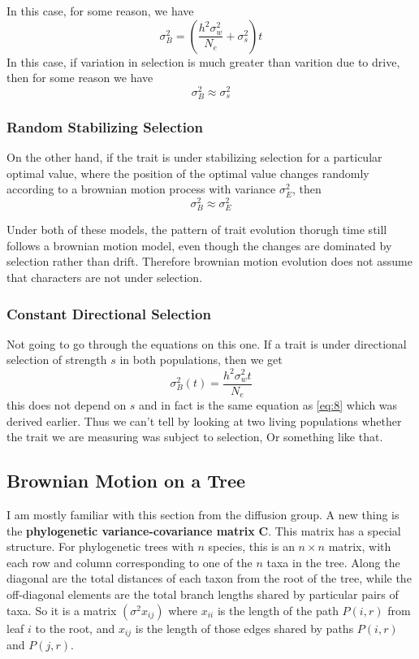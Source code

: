 \documentclass{article}
\newcommand{\1}[1]{\textbf{1}_{\left[#1\right]}} %
\newcommand{\bvar}{\sigma_{B}^{2}}  %
\newcommand{\wvar}{\sigma_{w}^{2}}  %
\newcommand{\svar}{\sigma_{s}^{2}}  %
\begin{document}
In this case, for some reason, we have
\begin{equation}
  \label{eq:9}
  \bvar = \left( \frac{h^{2}\wvar}{N_{e}}+ \svar \right)t
\end{equation}
In this case, if variation in selection is much greater than varition due to
drive, then for some reason we have
\begin{equation}
  \label{eq:3}
  \bvar \approx \svar
\end{equation}

\subsubsection{Random Stabilizing Selection}

On the other hand, if the trait is under stabilizing selection for a particular
optimal value, where the position of the optimal value changes randomly
according to a brownian motion process with variance $\sigma_{E}^{2}$, then
\begin{equation*}
  \bvar \approx \sigma^{2}_{E}
\end{equation*}

Under both of these models, the pattern of trait evolution thorugh time still
follows a brownian motion model, even though the changes are dominated by
selection rather than drift. Therefore brownian motion evolution does not assume
that characters are not under selection.

\subsubsection{Constant Directional Selection}

Not going to go through the equations on this one. If a trait is under
directional selection of strength $s$ in both populations, then we get
\begin{equation}
  \label{eq:10}
  \bvar(t) = \frac{h^{2}\wvar t}{N_{e}}
\end{equation}
this does not depend on $s$ and in fact is the same equation as \eqref{eq:8}
which was derived earlier. Thus we can't tell by looking at two living
populations whether the trait we are measuring was subject to selection, Or
something like that.

\subsection{Brownian Motion on a Tree}
I am mostly familiar with this section from the diffusion group. A new thing is
the \textbf{phylogenetic variance-covariance matrix} \textbf{C}. This matrix has a special
structure. For phylogenetic trees with $n$ species, this is an $n\times n$
matrix, with each row and column corresponding to one of the $n$ taxa in the tree.
Along the diagonal are the total distances of each taxon from the root of the
tree, while the off-diagonal elements are the total branch lengths shared by
particular pairs of taxa. So it is a matrix $(\sigma^{2}x_{ij})$ where $x_{ii}$
is the length of the path $P(i,r)$ from leaf $i$ to the root, and $x_{ij}$ is
the length of those edges shared by paths $P(i,r)$ and $P(j,r)$.
\end{document}

